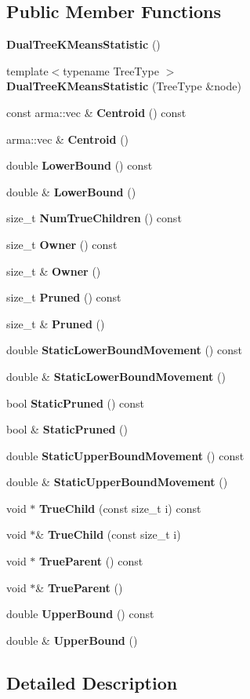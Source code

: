 \subsection*{Public Member Functions}
\begin{DoxyCompactItemize}
\item 
\textbf{ Dual\+Tree\+K\+Means\+Statistic} ()
\item 
{\footnotesize template$<$typename Tree\+Type $>$ }\\\textbf{ Dual\+Tree\+K\+Means\+Statistic} (Tree\+Type \&node)
\item 
const arma\+::vec \& \textbf{ Centroid} () const
\item 
arma\+::vec \& \textbf{ Centroid} ()
\item 
double \textbf{ Lower\+Bound} () const
\item 
double \& \textbf{ Lower\+Bound} ()
\item 
size\+\_\+t \textbf{ Num\+True\+Children} () const
\item 
size\+\_\+t \textbf{ Owner} () const
\item 
size\+\_\+t \& \textbf{ Owner} ()
\item 
size\+\_\+t \textbf{ Pruned} () const
\item 
size\+\_\+t \& \textbf{ Pruned} ()
\item 
double \textbf{ Static\+Lower\+Bound\+Movement} () const
\item 
double \& \textbf{ Static\+Lower\+Bound\+Movement} ()
\item 
bool \textbf{ Static\+Pruned} () const
\item 
bool \& \textbf{ Static\+Pruned} ()
\item 
double \textbf{ Static\+Upper\+Bound\+Movement} () const
\item 
double \& \textbf{ Static\+Upper\+Bound\+Movement} ()
\item 
void $\ast$ \textbf{ True\+Child} (const size\+\_\+t i) const
\item 
void $\ast$\& \textbf{ True\+Child} (const size\+\_\+t i)
\item 
void $\ast$ \textbf{ True\+Parent} () const
\item 
void $\ast$\& \textbf{ True\+Parent} ()
\item 
double \textbf{ Upper\+Bound} () const
\item 
double \& \textbf{ Upper\+Bound} ()
\end{DoxyCompactItemize}


\subsection{Detailed Description}


